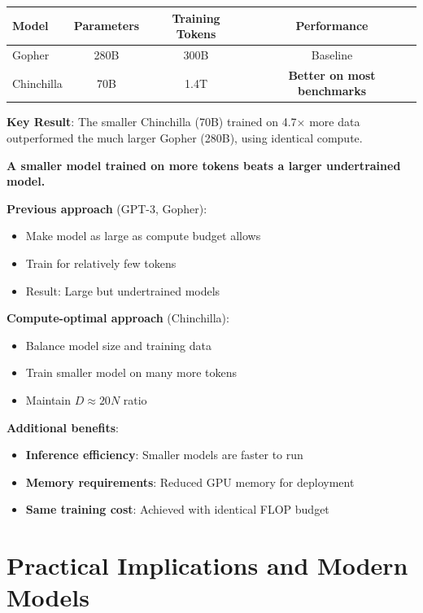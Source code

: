 \documentclass{article}
\begin{document}
\begin{center}
\begin{tabular}{lccc}
\toprule
\textbf{Model} & \textbf{Parameters} & \textbf{Training Tokens} & \textbf{Performance} \\
\midrule
Gopher & 280B & 300B & Baseline \\
Chinchilla & 70B & 1.4T & \textbf{Better on most benchmarks} \\
\bottomrule
\end{tabular}
\end{center}

\textbf{Key Result}: The smaller Chinchilla (70B) trained on 4.7× more data outperformed the much larger Gopher (280B), using identical compute.

\begin{tcolorbox}[colback=yellow!5!white, colframe=orange!50!black, title=The Chinchilla Lesson]
\textbf{A smaller model trained on more tokens beats a larger undertrained model.}

\textbf{Previous approach} (GPT-3, Gopher):
\begin{itemize}
\item Make model as large as compute budget allows
\item Train for relatively few tokens
\item Result: Large but undertrained models
\end{itemize}

\textbf{Compute-optimal approach} (Chinchilla):
\begin{itemize}
\item Balance model size and training data
\item Train smaller model on many more tokens
\item Maintain $D \approx 20N$ ratio
\end{itemize}

\textbf{Additional benefits}:
\begin{itemize}
\item \textbf{Inference efficiency}: Smaller models are faster to run
\item \textbf{Memory requirements}: Reduced GPU memory for deployment
\item \textbf{Same training cost}: Achieved with identical FLOP budget
\end{itemize}
\end{tcolorbox}

\section{Practical Implications and Modern Models}
\end{document}
